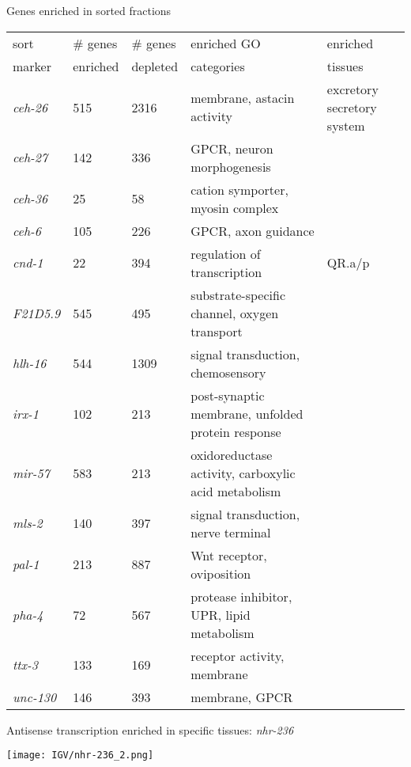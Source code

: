 \documentclass[serif,9pt]{beamer}
\begin{document}
\begin{frame}{Genes enriched in sorted fractions}

\begin{table}\footnotesize
\begin{tabular}{lllll}
sort & \# genes & \# genes & enriched GO & enriched \\
marker & enriched & depleted & categories & tissues \\
\hline
{\em ceh-26} & 515 & 2316 & membrane, astacin activity & excretory secretory system \\
{\em ceh-27} & 142 & 336 & GPCR, neuron morphogenesis &       \\
{\em ceh-36} & 25 & 58 & cation symporter, myosin complex &       \\
{\em ceh-6} & 105 & 226 & GPCR, axon guidance &       \\
{\em cnd-1} & 22 & 394 & regulation of transcription & QR.a/p      \\
{\em F21D5.9} & 545 & 495 & substrate-specific channel, oxygen transport &       \\
{\em hlh-16} & 544 & 1309 & signal transduction, chemosensory &       \\
{\em irx-1} & 102 & 213 & post-synaptic membrane, unfolded protein response &       \\
{\em mir-57} & 583 & 213 & oxidoreductase activity, carboxylic acid metabolism &       \\
{\em mls-2} & 140 & 397 & signal transduction, nerve terminal &       \\
{\em pal-1} & 213 & 887 & Wnt receptor, oviposition &       \\
{\em pha-4} & 72 & 567 & protease inhibitor, UPR, lipid metabolism   &       \\
{\em ttx-3} & 133 & 169 & receptor activity, membrane &       \\
{\em unc-130} & 146 & 393 & membrane, GPCR &       \\
\end{tabular}
\end{table}

\end{frame}

\begin{frame}{Antisense transcription enriched in specific tissues: {\em nhr-236}}

\texttt{[image: IGV/nhr-236\_2.png]}

\end{frame}
\end{document}
